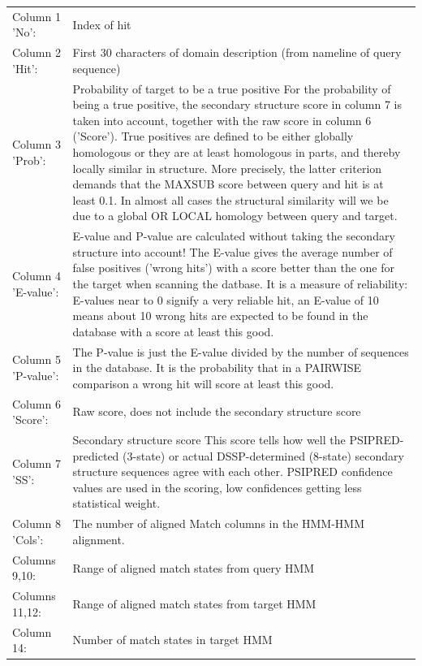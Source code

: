 \documentclass[11pt,a4paper]{article}
\begin{document}
\renewcommand{\arraystretch}{1.2}
\begin{longtable}{lp{120mm}}
Column 1 'No': & Index of hit\\

Column 2 'Hit': & First 30 characters of domain description (from nameline of query sequence)\\

Column 3 'Prob': & Probability of target to be a true positive
For the probability of being a true positive, the secondary structure score 
in column 7 is taken into account, together with the raw score in column 6 ('Score'). 
True positives are defined to be either globally homologous or they are at least 
homologous in parts, and thereby locally similar in structure. More precisely, 
the latter criterion demands that the MAXSUB score between query and hit is at 
least 0.1. In almost all cases the structural similarity will we be due to a global
OR LOCAL homology between query and target. \\

Column 4 'E-value': & 
E-value and P-value are calculated without taking the secondary structure into account!
The E-value gives the average number of false positives ('wrong hits') with a score 
better than the one for the target when scanning the datbase. It is a measure of 
reliability: E-values near to 0 signify a very reliable hit, an E-value of 10 means 
about 10 wrong hits are expected to be found in the database with a score at least 
this good.\\

Column 5 'P-value': & 
The P-value is just the E-value divided by the number of sequences in the database.
It is the probability that in a PAIRWISE comparison a wrong hit will score at least 
this good.\\

Column 6 'Score': & Raw score, does not include the secondary structure score\\

Column 7 'SS':    & Secondary structure score
This score tells how well the PSIPRED-predicted (3-state) or actual DSSP-determined 
(8-state) secondary structure sequences agree with each other. PSIPRED confidence 
values are used in the scoring, low confidences getting less statistical weight.\\

Column 8 'Cols': & The number of aligned Match columns in the HMM-HMM alignment.\\

Columns 9,10: &  Range of aligned match states from query HMM\\

Columns 11,12: & Range of aligned match states from target HMM\\
Column 14: & Number of match states in target HMM\\
\end{longtable}
\end{document}
